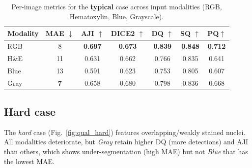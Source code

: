 \documentclass[target=bach,aauheader=,style=]{thud}
\begin{document}
\begin{table}[ht]
\centering
\caption{Per-image metrics for the \textbf{typical} case across input modalities (RGB, Hematoxylin, Blue, Grayscale). }
\label{tab:typical_metrics}
\begin{tabular}{lcccccc}
\toprule
Modality & MAE $\downarrow$ & AJI $\uparrow$ & DICE2 $\uparrow$ & DQ $\uparrow$ & SQ $\uparrow$ & PQ$\uparrow$ \\
\midrule
RGB  & 8 & \textbf{0.697} & \textbf{0.673} & \textbf{0.839} & \textbf{0.848} & \textbf{0.712} \\
H\&E & 11 & 0.631 & 0.662 & 0.766 & 0.835 & 0.641 \\
Blue & 13 & 0.591 & 0.623 & 0.753 & 0.805 & 0.607 \\
Gray & \textbf{7} & 0.658 & 0.680 & 0.798 & 0.836 & 0.668 \\
\bottomrule
\end{tabular}
\end{table}
\subsection{Hard case}
The \emph{hard} case (Fig.~\ref{fig:qual_hard}) features overlapping/weakly stained nuclei. All modalities deteriorate, but \emph{Gray} retain higher DQ (more detections) and AJI than others, which shows under-segmentation (high MAE) but not \emph{Blue} that has the lowest MAE.
\end{document}
